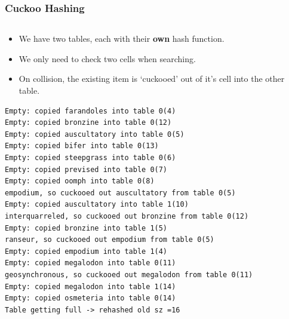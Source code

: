 \begin{frame}[fragile]
\frametitle{Cuckoo Hashing}
\begin{columns}[T]

\begin{column}{0.45\textwidth}
\begin{itemize}[<+->]
\item We have two tables, each with their {\bf own} hash function.
\item We only need to check two cells when searching.
\item On collision, the existing item is `cuckooed' out of it's cell into the other table.
\end{itemize}
{\tiny
\begin{verbatim}
Empty: copied farandoles into table 0(4)
Empty: copied bronzine into table 0(12)
Empty: copied auscultatory into table 0(5)
Empty: copied bifer into table 0(13)
Empty: copied steepgrass into table 0(6)
Empty: copied prevised into table 0(7)
Empty: copied oomph into table 0(8)
empodium, so cuckooed out auscultatory from table 0(5)
Empty: copied auscultatory into table 1(10)
interquarreled, so cuckooed out bronzine from table 0(12)
Empty: copied bronzine into table 1(5)
ranseur, so cuckooed out empodium from table 0(5)
Empty: copied empodium into table 1(4)
Empty: copied megalodon into table 0(11)
geosynchronous, so cuckooed out megalodon from table 0(11)
Empty: copied megalodon into table 1(14)
Empty: copied osmeteria into table 0(14)
Table getting full -> rehashed old sz =16
\end{verbatim}
}
\end{column}


\end{columns}
\end{frame}
